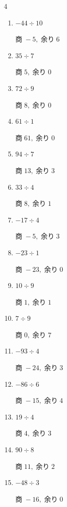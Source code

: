 \begin{multicols}{4}
\begin{enumerate}
  \item $-44 \div 10$

        $商\; -5,\; 余り\; 6$

\columnbreak %

  \item $35 \div 7$

        $商\; 5,\; 余り\; 0$

  \item $72 \div 9$

        $商\; 8,\; 余り\; 0$

  \item $61 \div 1$

        $商\; 61,\; 余り\; 0$

  \item $94 \div 7$

        $商\; 13,\; 余り\; 3$

  \item $33 \div 4$

        $商\; 8,\; 余り\; 1$

  \item $-17 \div 4$

        $商\; -5,\; 余り\; 3$

  \item $-23 \div 1$

        $商\; -23,\; 余り\; 0$

  \item $10 \div 9$

        $商\; 1,\; 余り\; 1$

  \item $7 \div 9$

        $商\; 0,\; 余り\; 7$

  \item $-93 \div 4$

        $商\; -24,\; 余り\; 3$

  \item $-86 \div 6$

        $商\; -15,\; 余り\; 4$

  \item $19 \div 4$

        $商\; 4,\; 余り\; 3$

  \item $90 \div 8$

        $商\; 11,\; 余り\; 2$

  \item $-48 \div 3$

        $商\; -16,\; 余り\; 0$


\end{enumerate}
\end{multicols}
